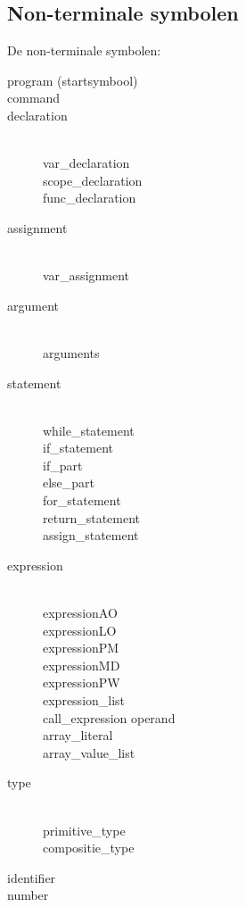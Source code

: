 \subsection{Non-terminale symbolen}
De non-terminale symbolen:
\begin{description}
    \item[program (startsymbool)] 
    \item[command]
    \item[declaration] \hfill \\
        var\_declaration \\
        scope\_declaration \\
        func\_declaration
    \item[assignment] \hfill \\
        var\_assignment
    \item[argument] \hfill \\
        arguments
    \item[statement] \hfill \\
        while\_statement \\
        if\_statement \\ 
        if\_part \\
        else\_part \\
        for\_statement \\
        return\_statement \\
        assign\_statement
    \item[expression] \hfill \\
        expressionAO \\
        expressionLO \\
        expressionPM \\
        expressionMD \\
        expressionPW \\
        expression\_list \\
        call\_expression
        operand \\
        array\_literal \\
        array\_value\_list
    \item[type] \hfill \\
        primitive\_type \\
        compositie\_type
    \item[identifier]
    \item[number]
\end{description}

